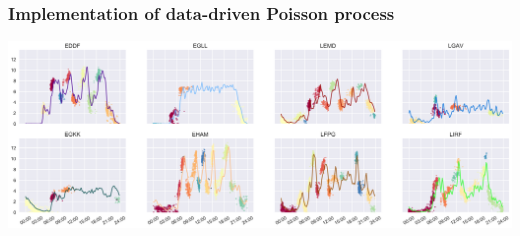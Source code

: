 \documentclass[table,aspectratio=169]{beamer}
\begin{document}
%
%
%
%
\begin{frame}[t]\frametitle{Implementation of data-driven Poisson process}
    \centering
    \includegraphics[width=\textwidth]{DDPoisson}
\end{frame}

%
%
%
\end{document}
